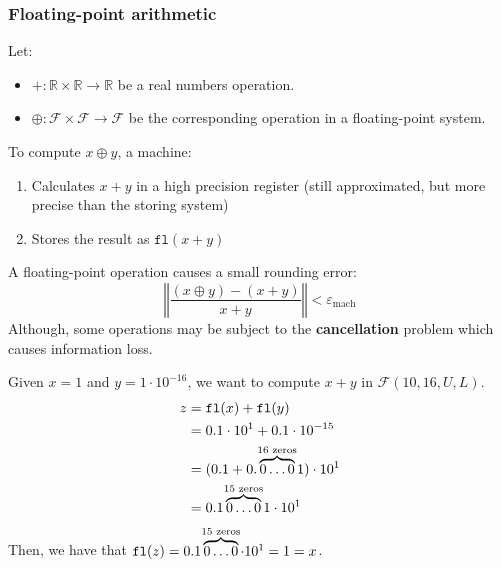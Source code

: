 \subsubsection{Floating-point arithmetic}
Let:
\begin{itemize}
    \item $+: \mathbb{R} \times \mathbb{R} \rightarrow \mathbb{R}$ be a real numbers operation.
    \item $\oplus: \mathcal{F} \times \mathcal{F} \rightarrow \mathcal{F}$ be the corresponding operation in a floating-point system.
\end{itemize}
%
To compute $x \oplus y$, a machine:
\begin{enumerate}
    \item Calculates $x + y$ in a high precision register (still approximated, but more precise than the storing system)
    \item Stores the result as $\texttt{fl}(x + y)$
\end{enumerate}

A floating-point operation causes a small rounding error:
\begin{equation}
    \left\Vert \frac{(x \oplus y) - (x + y)}{x+y} \right\Vert < \varepsilon_{\text{mach}}
\end{equation}
%
Although, some operations may be subject to the \textbf{cancellation} problem which causes information loss.
\begin{example}
    Given $x = 1$ and $y = 1 \cdot 10^{-16}$, we want to compute $x + y$ in $\mathcal{F}(10, 16, U, L)$.\\
    \begin{equation*}
        \begin{split}
            z & = \texttt{fl}(x) + \texttt{fl}(y) \\
              & = 0.1 \cdot 10^1 + 0.1 \cdot 10^{-15} \\
              & = (0.1 + 0.\overbrace{0\dots0}^{\mathclap{16\text{ zeros}}}1) \cdot 10^1 \\
              & = 0.1\overbrace{0\dots0}^{\mathclap{15\text{ zeros}}}1 \cdot 10^1
        \end{split}
    \end{equation*}
    Then, we have that $\texttt{fl}(z) = 0.1\overbrace{0\dots0}^{\mathclap{15\text{ zeros}}} \cdot 10^1 = 1 = x$.
\end{example}